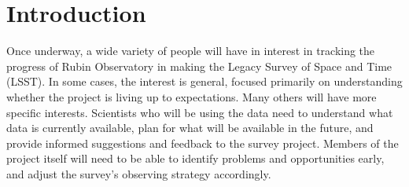 
\section{Introduction}
\label{sec:org777ce67}

Once underway, a wide variety of people will have in interest in tracking the progress of Rubin Observatory in making the Legacy Survey of Space and Time (LSST).
In some cases, the interest is general, focused primarily on understanding whether the project is living up to expectations.
Many others will have more specific interests.
Scientists who will be using the data need to understand what data is currently available, plan for what will be available in the future, and provide informed suggestions and feedback to the survey project. 
Members of the project itself will need to be able to identify problems and opportunities early, and adjust the survey's observing strategy accordingly.

